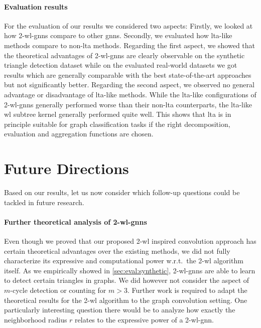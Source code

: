 \paragraph{Evaluation results}
For the evaluation of our results we considered two aspects:
Firstly, we looked at how 2-\acs{wl}-\acsp{gnn} compare to other \acp{gnn}.
Secondly, we evaluated how \acs{lta}-like methods compare to non-\acs{lta} methods.
Regarding the first aspect, we showed that the theoretical advantages of 2-\acs{wl}-\acsp{gnn} are clearly observable on the synthetic triangle detection dataset while on the evaluated real-world datasets we got results which are generally comparable with the best state-of-the-art approaches but not significantly better.
Regarding the second aspect, we observed no general advantage or disadvantage of \acs{lta}-like methods.
While the \acs{lta}-like configurations of 2-\acs{wl}-\acsp{gnn} generally performed worse than their non-\ac{lta} counterparts, the \acs{lta}-like \ac{wl} subtree kernel generally performed quite well.
This shows that \ac{lta} is in principle suitable for graph classification tasks if the right decomposition, evaluation and aggregation functions are chosen.

\section{Future Directions}%
\label{sec:conclusion:todo}

Based on our results, let us now consider which follow-up questions could be tackled in future research.

\paragraph{Further theoretical analysis of 2-\acs{wl}-\acsp{gnn}}
Even though we proved that our proposed 2-\acs{wl} inspired convolution approach has certain theoretical advantages over the existing methods, we did not fully characterize its expressive and computational power w.r.t.\ the 2-\acs{wl} algorithm itself.
As we empirically showed in \cref{sec:eval:synthetic}, 2-\acs{wl}-\acsp{gnn} are able to learn to detect certain triangles in graphs.
We did however not consider the aspect of $m$-cycle detection or counting for $m > 3$.
Further work is required to adapt the theoretical results for the 2-\acs{wl} algorithm to the graph convolution setting.
One particularly interesting question there would be to analyze how exactly the neighborhood radius $r$ relates to the expressive power of a 2-\acs{wl}-\acs{gnn}.

